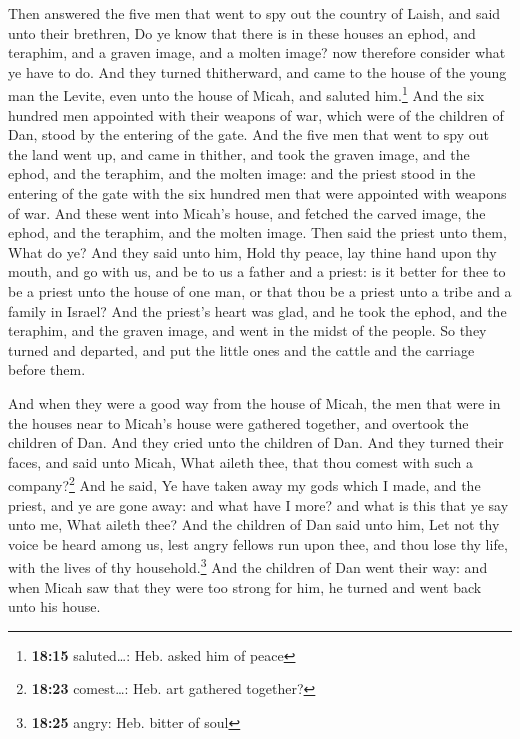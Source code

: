  Then answered the five men that went to spy out the
country of Laish, and said unto their brethren, Do ye know that there is
in these houses an ephod, and teraphim, and a graven image, and a molten
image? now therefore consider what ye have to do.  And
they turned thitherward, and came to the house of the young man the
Levite, even unto the house of Micah, and saluted him.\footnote{\textbf{18:15}
  saluted\ldots: Heb. asked him of peace}  And the six
hundred men appointed with their weapons of war, which were of the
children of Dan, stood by the entering of the gate.  And
the five men that went to spy out the land went up, and came in thither,
and took the graven image, and the ephod, and the teraphim, and the
molten image: and the priest stood in the entering of the gate with the
six hundred men that were appointed with weapons of war. 
And these went into Micah's house, and fetched the carved image, the
ephod, and the teraphim, and the molten image. Then said the priest unto
them, What do ye?  And they said unto him, Hold thy
peace, lay thine hand upon thy mouth, and go with us, and be to us a
father and a priest: is it better for thee to be a priest unto the house
of one man, or that thou be a priest unto a tribe and a family in
Israel?  And the priest's heart was glad, and he took the
ephod, and the teraphim, and the graven image, and went in the midst of
the people.  So they turned and departed, and put the
little ones and the cattle and the carriage before them.

 And when they were a good way from the house of Micah,
the men that were in the houses near to Micah's house were gathered
together, and overtook the children of Dan.  And they
cried unto the children of Dan. And they turned their faces, and said
unto Micah, What aileth thee, that thou comest with such a
company?\footnote{\textbf{18:23} comest\ldots: Heb. art gathered
  together?}  And he said, Ye have taken away my gods
which I made, and the priest, and ye are gone away: and what have I
more? and what is this that ye say unto me, What aileth thee?
 And the children of Dan said unto him, Let not thy voice
be heard among us, lest angry fellows run upon thee, and thou lose thy
life, with the lives of thy household.\footnote{\textbf{18:25} angry:
  Heb. bitter of soul}  And the children of Dan went
their way: and when Micah saw that they were too strong for him, he
turned and went back unto his house.

